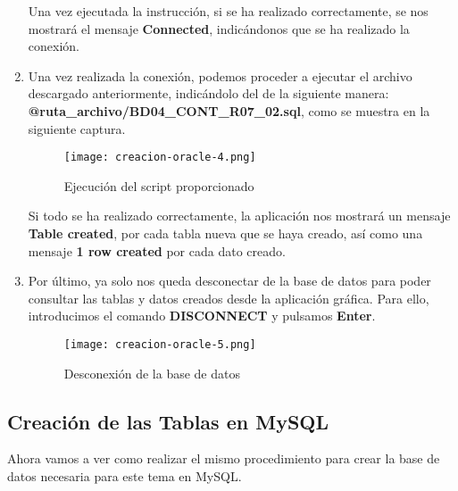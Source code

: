 \begin{enumerate}
    Una vez ejecutada la instrucción, si se ha realizado correctamente, se nos mostrará el mensaje \textbf{Connected}, indicándonos que se ha realizado la conexión.

    \item Una vez realizada la conexión, podemos proceder a ejecutar el archivo descargado anteriormente, indicándolo del de la siguiente manera: \textbf{@ruta\_archivo/BD04\_CONT\_R07\_02.sql}, como se muestra en la siguiente captura.

    \begin{figure}[H]
        \centering
        \texttt{[image: creacion-oracle-4.png]}
        \caption{Ejecución del script proporcionado}
    \end{figure}

    Si todo se ha realizado correctamente, la aplicación nos mostrará un mensaje \textbf{Table created}, por cada tabla nueva que se haya creado, así como una mensaje  \textbf{1 row created} por cada dato creado.

    \item Por último, ya solo nos queda desconectar de la base de datos para poder consultar las tablas y datos creados desde la aplicación gráfica. Para ello, introducimos el comando \textbf{DISCONNECT} y pulsamos \textbf{Enter}.

    \begin{figure}[H]
        \centering
        \texttt{[image: creacion-oracle-5.png]}
        \caption{Desconexión de la base de datos}
    \end{figure}
\end{enumerate}

\subsection{Creación de las Tablas en MySQL}
Ahora vamos a ver como realizar el mismo procedimiento para crear la base de datos necesaria para este tema en MySQL.

